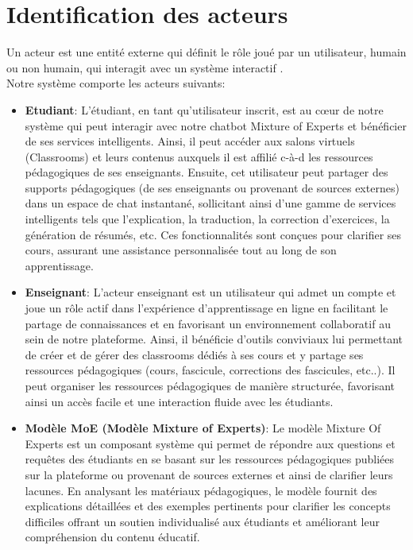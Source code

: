 \section{Identification des acteurs}
\justifying
Un acteur est une entité externe qui définit le rôle joué par un utilisateur, humain ou non humain, qui interagit avec un système interactif \cite{acteur}.\\
Notre système comporte les acteurs suivants:
\begin{itemize}[itemsep=2pt, parsep=2pt]
    \item \textbf{Etudiant}: L'étudiant, en tant qu'utilisateur inscrit, est au cœur de notre système qui peut interagir avec notre chatbot Mixture of Experts et bénéficier de ses services intelligents. Ainsi, il peut accéder aux salons virtuels (Classrooms) et leurs contenus auxquels il est affilié  c-à-d les ressources pédagogiques de ses enseignants. Ensuite, cet utilisateur peut partager des supports pédagogiques (de ses enseignants ou provenant de sources externes) dans un espace de chat instantané, sollicitant ainsi d'une gamme de services intelligents tels que l'explication, la traduction, la correction d'exercices, la génération de résumés, etc. Ces fonctionnalités sont conçues pour clarifier ses cours, assurant une assistance personnalisée tout au long de son apprentissage.
    \item \textbf{Enseignant}:  L'acteur enseignant est un utilisateur qui admet un compte et joue un rôle actif dans l'expérience d'apprentissage en ligne en facilitant le partage de connaissances et en favorisant un environnement collaboratif au sein de notre plateforme. Ainsi, il bénéficie d'outils conviviaux lui permettant de créer et de gérer des classrooms dédiés à ses cours et y partage ses ressources pédagogiques (cours, fascicule, corrections des fascicules, etc..). Il peut organiser les ressources pédagogiques de manière structurée, favorisant ainsi un accès facile et une interaction fluide avec les étudiants.
    \item \textbf{Modèle MoE (Modèle Mixture of Experts)}:  Le modèle Mixture Of Experts est un composant système qui permet de répondre aux questions et requêtes des étudiants en se basant sur les ressources pédagogiques publiées sur la plateforme ou provenant de sources externes et ainsi de clarifier leurs lacunes. En analysant les matériaux pédagogiques, le modèle fournit des explications détaillées et des exemples pertinents pour clarifier les concepts difficiles offrant un soutien individualisé aux étudiants et améliorant leur compréhension du contenu éducatif.
\end{itemize}

